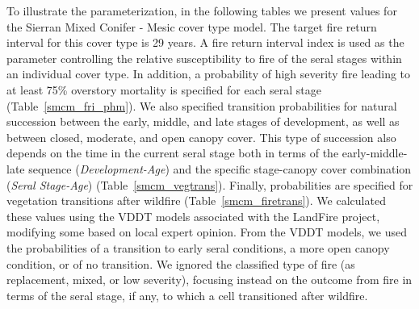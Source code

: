 To illustrate the parameterization, in the following tables we present values for the Sierran Mixed Conifer - Mesic cover type model. The target fire return interval for this cover type is 29 years. A fire return interval index is used as the parameter controlling the relative susceptibility to fire of the seral stages within an individual cover type. In addition, a probability of high severity fire leading to at least 75\% overstory mortality is specified for each seral stage (Table~\ref{smcm_fri_phm}). We also specified transition probabilities for natural succession between the early, middle, and late stages of development, as well as between closed, moderate, and open canopy cover. This type of succession also depends on the time in the current seral stage both in terms of the early-middle-late sequence (\emph{Development-Age}) and the specific stage-canopy cover combination (\emph{Seral Stage-Age}) (Table~\ref{smcm_vegtrans}). Finally, probabilities are specified for vegetation transitions after wildfire (Table~\ref{smcm_firetrans}). We calculated these values using the VDDT models associated with the LandFire project, modifying some based on local expert opinion. From the VDDT models, we used the probabilities of a transition to early seral conditions, a more open canopy condition, or of no transition. We ignored the classified type of fire (as replacement, mixed, or low severity), focusing instead on the outcome from fire in terms of the seral stage, if any, to which a cell transitioned after wildfire.

